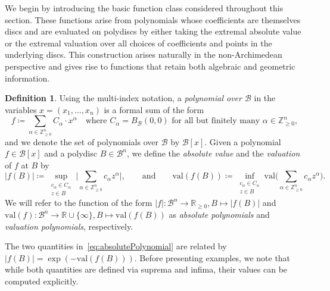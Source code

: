 \documentclass[10pt]{article}
\theoremstyle{definition}
\newtheorem{definition}[theorem]{Definition}
\newcommand{\RR}{\mathbb{R}}
\newcommand{\ZZ}{\mathbb{Z}}
\newcommand{\val}{{\mathrm{val}}}
\begin{document}
We begin by introducing the basic function class considered throughout this section. These functions arise from polynomials whose coefficients are themselves discs and are evaluated on polydiscs by either taking the extremal absolute value or the extremal valuation over all choices of coefficients and points in the underlying discs. This construction arises naturally in the non-Archimedean perspective and gives rise to functions that retain both algebraic and geometric information.

\begin{definition}
  \label{def:discPolynomials}
  Using the multi-index notation, a \emph{polynomial over $\mathcal B$} in the variables $x=(x_1,\dots,x_n)$ is a formal sum of the form
  \begin{equation*}
    f\coloneqq \sum_{\alpha\in\ZZ_{\geq 0}^n} C_\alpha\cdot x^\alpha \quad\text{where } C_\alpha=B_\mathcal{B}(0,0) \text{ for all but finitely many } \alpha\in\ZZ_{\geq 0}^n,
  \end{equation*}
  and we denote the set of polynomials over $\mathcal B$ by $\mathcal B[x]$. %
  Given a polynomial $f\in \mathcal B[x]$ and a polydisc $B\in\mathcal B^n$, we define the \emph{absolute value} and the \emph{valuation} of $f$ at $B$ by
  \begin{equation}
    \label{eq:absolutePolynomial}
      |f(B)|\coloneqq \sup_{\substack{c_\alpha\in C_\alpha\\ z\in B}}\Big|\sum_{\alpha\in\ZZ_{\geq 0}^n} c_\alpha z^\alpha\Big|, \qquad\text{and}\qquad
      \val(f(B))\coloneqq \inf_{\substack{c_\alpha\in C_\alpha\\ z\in B}} \val\Big(\sum_{\alpha\in\ZZ_{\geq 0}^n} c_\alpha z^\alpha\Big).
  \end{equation}
  We will refer to the function of the form $|f|\colon\mathcal B^n\rightarrow\RR_{\geq 0}, B\mapsto |f(B)|$ and $\val(f)\colon\mathcal B^n\rightarrow\RR \cup \{\infty\}, B\mapsto \val(f(B))$ as \emph{absolute polynomials} and \emph{valuation polynomials}, respectively.
\end{definition}

The two quantities in~\eqref{eq:absolutePolynomial} are related by $|f(B)|= \exp(-\val(f(B)))$.  Before presenting examples, we note that while both quantities are defined via suprema and infima, their values can be computed explicitly.
\end{document}
